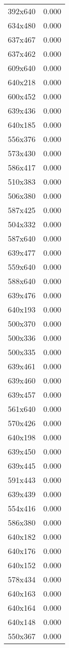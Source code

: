 \begin{table}
\begin{tabular}{lr}
392x640 & 0.000 \\
634x480 & 0.000 \\
637x467 & 0.000 \\
637x462 & 0.000 \\
609x640 & 0.000 \\
640x218 & 0.000 \\
600x452 & 0.000 \\
639x436 & 0.000 \\
640x185 & 0.000 \\
556x376 & 0.000 \\
573x430 & 0.000 \\
586x417 & 0.000 \\
510x383 & 0.000 \\
506x380 & 0.000 \\
587x425 & 0.000 \\
504x332 & 0.000 \\
587x640 & 0.000 \\
639x477 & 0.000 \\
559x640 & 0.000 \\
588x640 & 0.000 \\
639x476 & 0.000 \\
640x193 & 0.000 \\
500x370 & 0.000 \\
500x336 & 0.000 \\
500x335 & 0.000 \\
639x461 & 0.000 \\
639x460 & 0.000 \\
639x457 & 0.000 \\
561x640 & 0.000 \\
570x426 & 0.000 \\
640x198 & 0.000 \\
639x450 & 0.000 \\
639x445 & 0.000 \\
591x443 & 0.000 \\
639x439 & 0.000 \\
554x416 & 0.000 \\
586x380 & 0.000 \\
640x182 & 0.000 \\
640x176 & 0.000 \\
640x152 & 0.000 \\
578x434 & 0.000 \\
640x163 & 0.000 \\
640x164 & 0.000 \\
640x148 & 0.000 \\
550x367 & 0.000 \\

\end{tabular}
\end{table}

